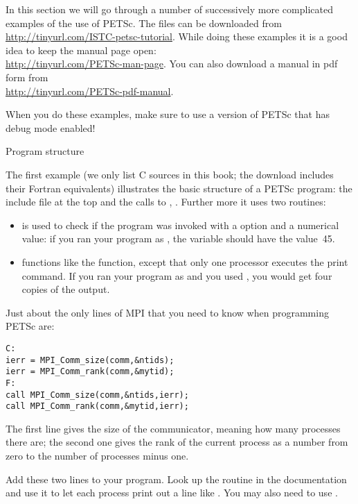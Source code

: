 In this section we will go through a number of successively more
complicated examples of the use of PETSc. The files can be downloaded
from\\
\url{http://tinyurl.com/ISTC-petsc-tutorial}. While doing these
examples it is a good idea to keep the manual page open:\\
\url{http://tinyurl.com/PETSc-man-page}. You can also download a
manual in pdf form from\\
\url{http://tinyurl.com/PETSc-pdf-manual}.

When you do these examples, make sure to use a version of PETSc that
has debug mode enabled!

 {Program structure}

The first example (we only list C sources in this book; the download
includes their Fortran equivalents) illustrates the basic structure of
a PETSc program: the include file at the top and the calls to
, . Further more it uses two
routines:
\begin{itemize}
\item {} is used to check if the program was
  invoked with a  option and a numerical value: if you ran your
  program as , the variable  should have the
  value~45.
\item {} functions like the  function, except
  that only one processor executes the print command. If you ran your
  program as  and you used , you would
  get four copies of the output.
\end{itemize}


Just about  the only lines
of MPI that you need to know when programming PETSc are:
\begin{verbatim}
C:
ierr = MPI_Comm_size(comm,&ntids);
ierr = MPI_Comm_rank(comm,&mytid);
F:
call MPI_Comm_size(comm,&ntids,ierr);
call MPI_Comm_rank(comm,&mytid,ierr);
\end{verbatim}
The first line gives the size of the communicator, meaning how many
processes there are; the second one gives the rank of the current
process as a number from zero to the number of processes minus one.

\begin{exercise}
Add these two lines to your program.
Look up the routine  in the documentation
and use it to let each process print out a line like . You may also need to use .
\end{exercise}


